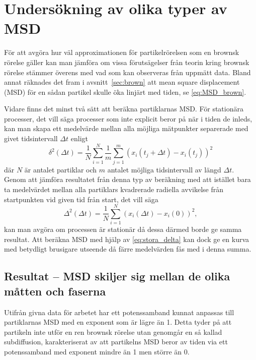     




\section{Undersökning av olika typer av MSD}

För att avgöra hur väl approximationen för partikelrörelsen som en brownsk rörelse gäller kan man jämföra om vissa förutsägelser från teorin kring brownsk rörelse stämmer överens med vad som kan observeras från uppmätt data. Bland annat räknades det fram i avsnitt~\ref{sec:brown} att mean square displacement (MSD) för en sådan partikel skulle öka linjärt med tiden, se \eqref{eq:MSD_brown}.

Vidare finns det minst två sätt att beräkna partiklarnas MSD. För stationära processer, det vill säga processer som inte explicit beror på när i tiden de inleds, kan man skapa ett medelvärde mellan alla möjliga mätpunkter separerade med givet tidsintervall $\Delta{t}$ enligt
\begin{equation} \label{eq:lilla_delta}
    \delta^2(\Delta t)= \frac{1}{N}\sum^N_{i=1}\frac{1}{m}\sum^m_{j=1}(x_i(t_j+\Delta t)-x_i(t_j))^2
\end{equation} 
där $N$ är antalet partiklar och $m$ antalet möjliga tidsintervall av längd $\Delta t$.
Genom att jämföra resultatet från denna typ av beräkning med att istället bara ta medelvärdet mellan alla partiklars kvadrerade radiella avvikelse från startpunkten vid given tid från start, det vill säga
\begin{equation} \label{eq:stora_delta}%
    \Delta^2(\Delta t)= \frac{1}{N}\sum^N_{i=1}(x_i(\Delta t)-x_i(0))^2,
\end{equation} 
kan man avgöra om processen är stationär då dessa därmed borde ge samma resultat. Att beräkna MSD med hjälp av \eqref{eq:stora_delta} kan dock ge en kurva med betydligt brusigare utseende då färre medelvärden fås med i denna summa. 

\subsection{Resultat -- MSD skiljer sig mellan de olika måtten och faserna}
Utifrån givna data för arbetet har ett potenssamband kunnat anpassas till partiklarnas MSD med en exponent som är lägre än 1. Detta tyder på att partikeln inte utför en ren brownsk rörelse utan genomgår en så kallad subdiffusion, karakteriserat av att partikelns MSD beror av tiden via ett potenssamband med exponent mindre än 1 men större än 0.

